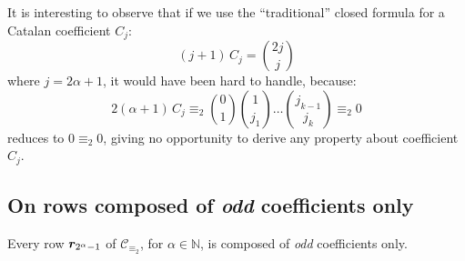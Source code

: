 It is interesting to observe that if we use the ``traditional'' closed formula
for a Catalan coefficient $C_{j}$:
\begin{displaymath}
    (j+1)\,C_{j} = {{2j}\choose{j}} 
\end{displaymath}
where $j=2\alpha+1$, it would have been hard to handle, because:
\begin{displaymath}
    2(\alpha+1)\,C_{j}\equiv_{2} {{0}\choose{1}}{{1}\choose{j_{1}}}
            \ldots{{j_{k-1}}\choose{j_{k}}} \equiv_{2} 0
\end{displaymath}
reduces to $0\equiv_{2}0$, giving no opportunity to derive any
property about coefficient $C_{j}$.



\subsection{On rows composed of \emph{odd} coefficients only}

\begin{theorem}
    Every row $\boldsymbol{r}_{2^{\alpha}-1}$ of $\mathcal{C}_{\equiv_{2}}$, 
    for $\alpha\in\mathbb{N}$, is composed of \emph{odd} coefficients only.
    \label{thm:odd:coeff:only:on:last:but:one:row}
\end{theorem}

